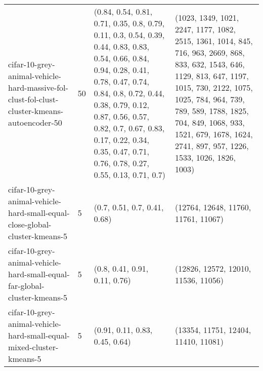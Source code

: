 \begin{longtable}{llll}
                  cifar-10-grey-animal-vehicle-hard-massive-fol-clust-fol-clust-cluster-kmeans-autoencoder-50 &             50 &   (0.84, 0.54, 0.81, 0.71, 0.35, 0.8, 0.79, 0.11, 0.3, 0.54, 0.39, 0.44, 0.83, 0.83, 0.54, 0.66, 0.84, 0.94, 0.28, 0.41, 0.78, 0.47, 0.74, 0.84, 0.8, 0.72, 0.44, 0.38, 0.79, 0.12, 0.87, 0.56, 0.57, 0.82, 0.7, 0.67, 0.83, 0.17, 0.22, 0.34, 0.35, 0.47, 0.71, 0.76, 0.78, 0.27, 0.55, 0.13, 0.71, 0.7) &                   (1023, 1349, 1021, 2247, 1177, 1082, 2515, 1361, 1014, 845, 716, 963, 2669, 868, 833, 632, 1543, 646, 1129, 813, 647, 1197, 1015, 730, 2122, 1075, 1025, 784, 964, 739, 789, 589, 1788, 1825, 704, 849, 1068, 933, 1521, 679, 1678, 1624, 2741, 897, 957, 1226, 1533, 1026, 1826, 1003) \\
                                  cifar-10-grey-animal-vehicle-hard-small-equal-close-global-cluster-kmeans-5 &              5 &                                                                                                                                                                                                                                                                              (0.7, 0.51, 0.7, 0.41, 0.68) &                                                                                                                                                                                                                                                                       (12764, 12648, 11760, 11761, 11067) \\
                                    cifar-10-grey-animal-vehicle-hard-small-equal-far-global-cluster-kmeans-5 &              5 &                                                                                                                                                                                                                                                                             (0.8, 0.41, 0.91, 0.11, 0.76) &                                                                                                                                                                                                                                                                       (12826, 12572, 12010, 11536, 11056) \\
                                         cifar-10-grey-animal-vehicle-hard-small-equal-mixed-cluster-kmeans-5 &              5 &                                                                                                                                                                                                                                                                            (0.91, 0.11, 0.83, 0.45, 0.64) &                                                                                                                                                                                                                                                                       (13354, 11751, 12404, 11410, 11081) \\

\end{longtable}
